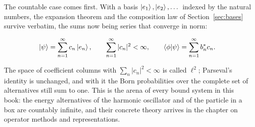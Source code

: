 The countable case comes first. With a basis $\ket{e_1},\ket{e_2},\dots$ indexed by the natural numbers, the expansion theorem and the composition law of Section~\ref{sec:bases} survive verbatim, the sums now being series that converge in norm:
\begin{linenomath}
    \begin{equation}
        \ket{\psi}=\sum_{n=1}^{\infty}c_n\ket{e_n},
        \qquad
        \sum_{n=1}^{\infty}|c_n|^2<\infty,
        \qquad
        \braket{\phi|\psi}=\sum_{n=1}^{\infty}b_n^{*}c_n .
        \label{eq:ell2-expansion}
    \end{equation}
\end{linenomath}
The space of coefficient columns with $\sum_n|c_n|^2<\infty$ is called $\ell^2$; Parseval's identity is unchanged, and with it the Born probabilities over the complete set of alternatives still sum to one. This is the arena of every bound system in this book: the energy alternatives of the harmonic oscillator and of the particle in a box are countably infinite, and their concrete theory arrives in the chapter on operator methods and representations.

